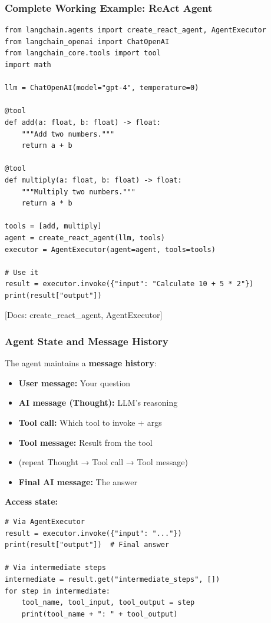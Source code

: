 \documentclass[aspectratio=169,11pt]{beamer}
\newcommand{\docref}[1]{{\scriptsize\color{docgray}[Docs: #1]}}
\begin{document}
\begin{frame}[fragile]
\frametitle{Complete Working Example: ReAct Agent}

\begin{lstlisting}
from langchain.agents import create_react_agent, AgentExecutor
from langchain_openai import ChatOpenAI
from langchain_core.tools import tool
import math

llm = ChatOpenAI(model="gpt-4", temperature=0)

@tool
def add(a: float, b: float) -> float:
    """Add two numbers."""
    return a + b

@tool
def multiply(a: float, b: float) -> float:
    """Multiply two numbers."""
    return a * b

tools = [add, multiply]
agent = create_react_agent(llm, tools)
executor = AgentExecutor(agent=agent, tools=tools)

# Use it
result = executor.invoke({"input": "Calculate 10 + 5 * 2"})
print(result["output"])
\end{lstlisting}

\docref{create\_react\_agent, AgentExecutor}

\end{frame}

\begin{frame}
\frametitle{Agent State and Message History}

The agent maintains a \textbf{message history}:

\vspace{0.3cm}

\begin{itemize}
  \item \textbf{User message:} Your question
  \item \textbf{AI message (Thought):} LLM's reasoning
  \item \textbf{Tool call:} Which tool to invoke + args
  \item \textbf{Tool message:} Result from the tool
  \item (repeat Thought → Tool call → Tool message)
  \item \textbf{Final AI message:} The answer
\end{itemize}

\vspace{0.5cm}

\textbf{Access state:}

\begin{lstlisting}
# Via AgentExecutor
result = executor.invoke({"input": "..."})
print(result["output"])  # Final answer

# Via intermediate steps
intermediate = result.get("intermediate_steps", [])
for step in intermediate:
    tool_name, tool_input, tool_output = step
    print(tool_name + ": " + tool_output)
\end{lstlisting}

\end{frame}
\end{document}
